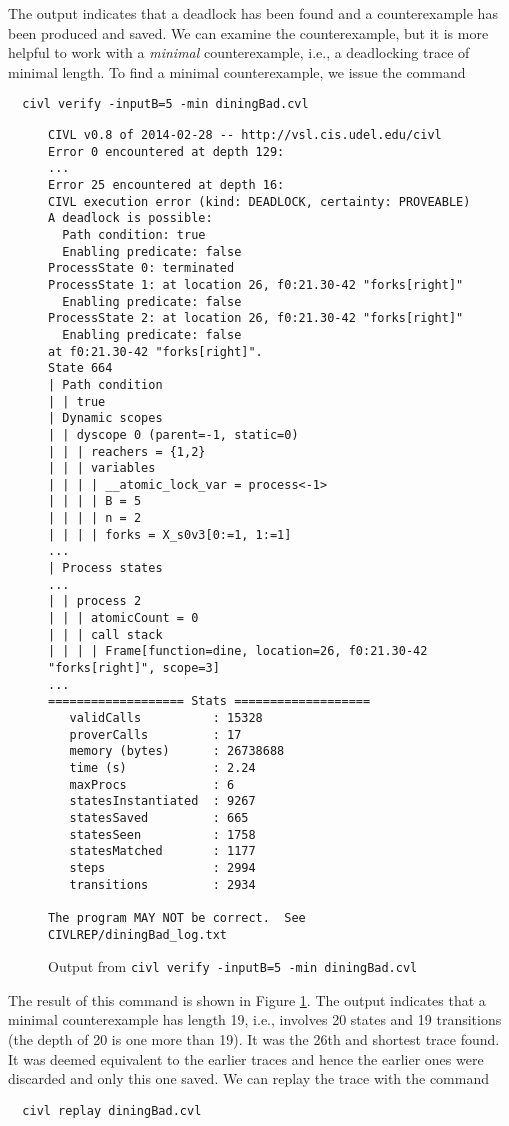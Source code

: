 The output indicates that a deadlock has been found and a
counterexample has been produced and saved. We can examine the
counterexample, but it is more helpful to work with a \emph{minimal}
counterexample, i.e., a deadlocking trace of minimal length. To find a
minimal counterexample, we issue the command

\begin{verbatim}
  civl verify -inputB=5 -min diningBad.cvl
\end{verbatim}

\begin{figure}[t]
  \begin{small}
\begin{verbatim}
CIVL v0.8 of 2014-02-28 -- http://vsl.cis.udel.edu/civl
Error 0 encountered at depth 129:
...
Error 25 encountered at depth 16:
CIVL execution error (kind: DEADLOCK, certainty: PROVEABLE)
A deadlock is possible:
  Path condition: true
  Enabling predicate: false
ProcessState 0: terminated
ProcessState 1: at location 26, f0:21.30-42 "forks[right]"
  Enabling predicate: false
ProcessState 2: at location 26, f0:21.30-42 "forks[right]"
  Enabling predicate: false
at f0:21.30-42 "forks[right]".
State 664
| Path condition
| | true
| Dynamic scopes
| | dyscope 0 (parent=-1, static=0)
| | | reachers = {1,2}
| | | variables
| | | | __atomic_lock_var = process<-1>
| | | | B = 5
| | | | n = 2
| | | | forks = X_s0v3[0:=1, 1:=1]
...
| Process states
...
| | process 2
| | | atomicCount = 0
| | | call stack
| | | | Frame[function=dine, location=26, f0:21.30-42 "forks[right]", scope=3]
...
=================== Stats ===================
   validCalls          : 15328
   proverCalls         : 17
   memory (bytes)      : 26738688
   time (s)            : 2.24
   maxProcs            : 6
   statesInstantiated  : 9267
   statesSaved         : 665
   statesSeen          : 1758
   statesMatched       : 1177
   steps               : 2994
   transitions         : 2934

The program MAY NOT be correct.  See CIVLREP/diningBad_log.txt
\end{verbatim}
  \end{small}
  \caption{Output from \texttt{civl verify -inputB=5 -min diningBad.cvl}}
  \label{fig:diningOut}
\end{figure}

The result of this command is shown in Figure \ref{fig:diningOut}. The
output indicates that a minimal counterexample has length 19, i.e.,
involves 20 states and 19 transitions (the depth of 20 is one more
than 19).    It was the 26th and shortest trace found.  It was deemed
equivalent to the earlier traces and hence the earlier ones were
discarded and only this one saved.  We can replay the trace with the command
\begin{verbatim}
  civl replay diningBad.cvl
\end{verbatim}

